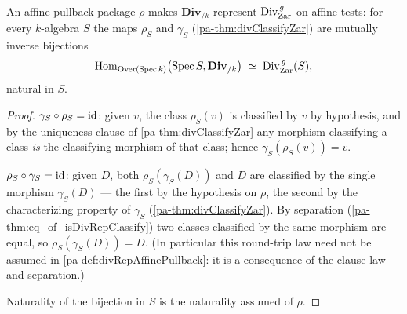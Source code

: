 \begin{theorem}
  \label{pa-thm:divRepAffinePullback_equiv}
  \leanok

  An affine pullback package \(\rho\) makes \(\mathbf{Div}_{/k}\) represent
  \(\operatorname{Div}^{\,g}_{\mathrm{Zar}}\) on affine tests: for every \(k\)-algebra \(S\) the maps
  \(\rho_S\) and \(\gamma_S\) (\ref{pa-thm:divClassifyZar}) are mutually inverse bijections
  \[
    \operatorname{Hom}_{\mathrm{Over}(\operatorname{Spec} k)}\bigl(\operatorname{Spec} S, \mathbf{Div}_{/k}\bigr)
      \;\simeq\; \operatorname{Div}^{\,g}_{\mathrm{Zar}}(S),
  \]
  natural in \(S\).
\end{theorem}
\begin{proof}
  \leanok
  \(\gamma_S \circ \rho_S = \operatorname{id}\): given \(v\), the class \(\rho_S(v)\) is classified by
  \(v\) by hypothesis, and by the uniqueness clause of \ref{pa-thm:divClassifyZar} any
  morphism classifying a class \emph{is} the classifying morphism of that class; hence
  \(\gamma_S(\rho_S(v)) = v\).

  \(\rho_S \circ \gamma_S = \operatorname{id}\): given \(D\), both \(\rho_S(\gamma_S(D))\) and \(D\) are
  classified by the single morphism \(\gamma_S(D)\) --- the first by the hypothesis on
  \(\rho\), the second by the characterizing property of \(\gamma_S\)
  (\ref{pa-thm:divClassifyZar}). By separation (\ref{pa-thm:eq_of_isDivRepClassify}) two classes
  classified by the same morphism are equal, so \(\rho_S(\gamma_S(D)) = D\). (In particular
  this round-trip law need not be assumed in \ref{pa-def:divRepAffinePullback}: it is a
  consequence of the clause law and separation.)

  Naturality of the bijection in \(S\) is the naturality assumed of \(\rho\).
\end{proof}

